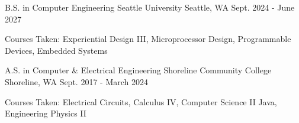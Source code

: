 

\begin{cventries}

  \cventry
    {B.S. in Computer Engineering} %
    {Seattle University} %
    {Seattle, WA} %
    {Sept. 2024 - June 2027} %
    {
      \begin{cvitems} %
        \item {Courses Taken: Experiential Design III, Microprocessor Design, Programmable Devices, Embedded Systems}
      \end{cvitems}
    }

  \cventry
    {A.S. in Computer \& Electrical Engineering} %
    {Shoreline Community College	} %
    {Shoreline, WA} %
    {Sept. 2017 - March 2024} %
    {
      \begin{cvitems} %
        \item {Courses Taken: Electrical Circuits, Calculus IV, Computer Science II Java, Engineering Physics II}
      \end{cvitems}
    }
    
\end{cventries}
